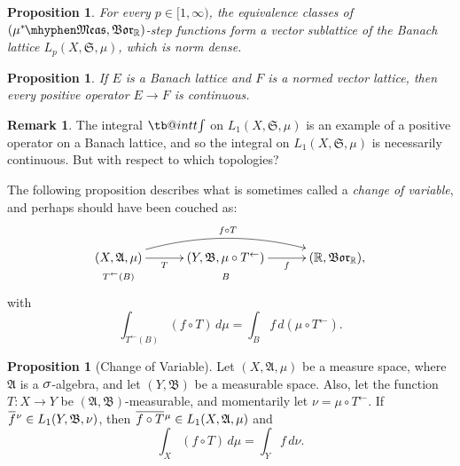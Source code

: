 \documentclass[
twoside=true,
paper=letter,
fontsize=11pt,
pagesize=auto,
leqno,
openany,
headsepline,
overfullrule,
]{scrbook}
\makeatletter
\theoremstyle{plain}
\theoremstyle{plain}
\newtheorem{prop}[thm]{Proposition}
\theoremstyle{definition}
\newtheorem{rmk}[thm]{Remark}
\theoremstyle{bfnoteitalic}
\newtheorem{propboldnote}[thm]{Proposition}
\theoremstyle{bfnoteroman}
\newcommand{\sigalg}[1]{\mathfrak{#1}}
\newcommand{\borel}{\mathfrak{Bor}}
\newcommand{\textsigma}{\hbox{\large{$\sigma$}}\kern-1pt}
\newcommand{\preimage}[1]{#1^{\leftarrow}}
\newcommand{\R}{\mathbb{R}}
\newcommand{\semiring}{\sigalg{S}}
\newcommand{\sigmaalgebra}{\sigalg{A}}
\newcommand{\sigmaalgebraii}{\sigalg{B}}
\newcommand{\measurable}[1]{{#1}\mhyphen\mathfrak{Meas}}
\newcommand{\kernast}{\ast\kern-1pt}
\newcommand{\function}{f}
\newcommand{\measurespace}{X}
\newcommand{\measurespaceii}{Y}
\newcommand{\measure}{\mu}
\newcommand{\measureii}{\nu}
\newcommand{\setii}{B}
\newcommand*\xbar[1]{%
   \hbox{%
     \vbox{%
       \hrule height 0.4pt %
       \kern0.4ex%
       \hbox{%
         \ensuremath{#1}%
       }%
     }%
   }%
}
\newcommand\tint{\mathop{\mathpalette\tb@int{t}}\!\int}
\newcommand\tb@int[2]{%
  \sbox\z@{$\m@th#1\int$}%
  \if#2t%
    \rlap{\hbox to\wd\z@{%
      \hfil
      \vrule width .35em height \dimexpr\ht\z@+1.4pt\relax depth -\dimexpr\ht\z@+1pt\relax
      \kern.05em %
    }}
  \else
    \rlap{\hbox to\wd\z@{%
      \vrule width .35em height -\dimexpr\dp\z@+1pt\relax depth \dimexpr\dp\z@+1.4pt\relax
      \hfil
    }}
  \fi
}
\newcommand{\lebclass}[1]{\hspace{.5pt}\xbar{#1}\hspace{0.5pt}}
\newcommand{\ellclass}[2]{\lebclass{#1}^{#2}}
\newcommand{\inducedint}{\tint}
\makeatother
\begin{document}
\begin{prop}\label{step_functions_dense}
For every $p\in [1, \infty)$, the equivalence classes of $(\measurable{\measure^\kernast}, \borel_\R)$-step functions form a vector sublattice of the Banach lattice $L_p(\measurespace, \semiring, \measure)$, which is norm dense.
\end{prop}



\begin{prop}\label{integral_continuous}
If $E$ is a Banach lattice and $F$ is a normed vector lattice, then every positive operator $E\to F$ is continuous.
\end{prop}



\begin{rmk}
The integral $\inducedint$ on $L_1(\measurespace, \semiring, \measure)$ is an example of a positive operator on a Banach lattice, and so the integral on $L_1(\measurespace, \semiring, \measure)$ is necessarily continuous. But with respect to which topologies?
\end{rmk}







The following proposition describes what is sometimes called a \emph{change of variable}, and perhaps should have been couched as:
\[
\xymatrix@R=0pt@C=30pt{ 
(\measurespace,\sigmaalgebra,\measure)
\ar[r]_-{T} \ar@/^16pt/[rr]^{f\circ T}
& (\measurespaceii,\sigmaalgebraii,\measure\circ\preimage{T})
\ar[r]_-{\function}
& (\R,\borel_\R), \\
\scriptstyle{\preimage{T}(\setii)} & \scriptstyle{\setii} & \\
}
\]
with
\[
\int_{\preimage{T}(\setii)} (\function\circ T) \, d\measure
= \int_\setii \function \, d (\measure\circ\preimage{T}).
\]


\begin{propboldnote}[Change of Variable]\label{change_of_variable}
Let $(\measurespace,\sigmaalgebra,\measure)$ be a measure space, where $\sigmaalgebra$ is a $\textsigma$-algebra, and let $(\measurespaceii, \sigmaalgebraii)$ be a measurable space.  Also, let the function $T:\measurespace\to\measurespaceii$ be $(\sigmaalgebra, \sigmaalgebraii)$\hyp{}measurable, and momentarily let 
$\measureii = \measure\circ\preimage{T}$.
If
$\ellclass{\function}{\measureii} 
\in L_1(\measurespaceii, \sigmaalgebraii, \measureii)$, 
then 
$\ellclass{\function\circ T}{\measure}
\in
L_1(\measurespace, \sigmaalgebra, \measure)$
and
\[
\int_\measurespace (f\circ T) \, d\measure
= \int_\measurespaceii f \, d\measureii.
\]
\end{propboldnote}
\end{document}
